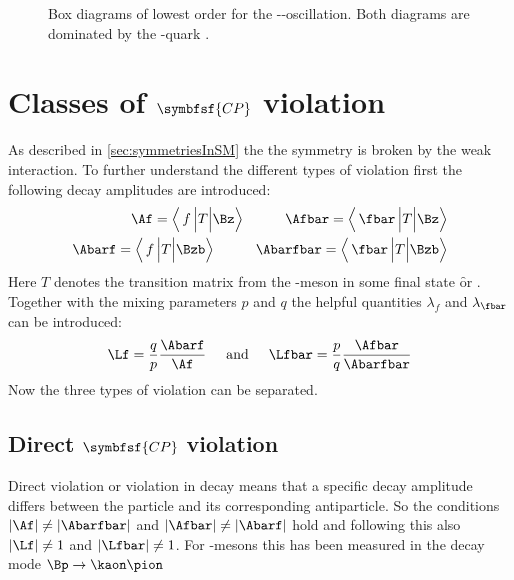 \begin{figure}[tbp]
	\centering
	
	\hspace{0.5cm}
	
	\caption{Box diagrams of lowest order for the \Bz-\Bzb-oscillation. Both diagrams are dominated by the \tquark-quark \cite{Ellis:2016jkw}.}
	\label{fig:FeynmanMixing}
\end{figure}

\section[head={Types of \CP violation},tocentry={Classes of \CP violation}]{Classes of $\symbfsf{C{}P}$ violation}
\label{sec:CPVClasses}

As described in \cref{sec:symmetriesInSM} the the \CP symmetry is broken by the weak interaction. To further understand
the different types of \CP violation first the following decay amplitudes are introduced:
\begin{equation}
\begin{split}
\Af = \left<\,f\,\Big|T\Big|\Bz\right>\hspace{1cm}\Afbar = \left<\,\fbar\,\Big|T\Big|\Bz\right>\\
\Abarf = \left<\,f\,\Big|T\Big|\Bzb\right>\hspace{1cm}\Abarfbar = \left<\,\fbar\,\Big|T\Big|\Bzb\right>
\end{split}
\end{equation}
Here $T$ denotes the transition matrix from the \B-meson in some final state \f or \fbar. Together with the
mixing parameters $p$ and $q$ the helpful quantities $\lambda_f$ and $\lambda_{\fbar}$ can be introduced:
\begin{equation}
\Lf=\frac{q}{p}\frac{\Abarf}{\Af}\hspace{0.5cm}\text{and}
\hspace{0.5cm}\Lfbar=\frac{p}{q}\frac{\Afbar}{\Abarfbar}
\end{equation}
Now the three types of \CP violation can be separated.

\subsection[head={Direct \CP violation},tocentry={Direct \CP violation}]{Direct $\symbfsf{C{}P}$ violation}
\label{sec:DirectCPV}

Direct \CP violation or \CP violation in decay means that a specific decay amplitude differs between the particle and  its
corresponding antiparticle. So the conditions $\left|\Af\right|\neq\left|\Abarfbar\right|$ and
$\left|\Afbar\right|\neq\left|\Abarf\right|$ hold and following this also $\left|\Lf\right|\neq1$ and $\left|\Lfbar\right|\neq1$.
For \B-mesons this has been measured in the decay mode $\Bp\to\kaon\pion$

